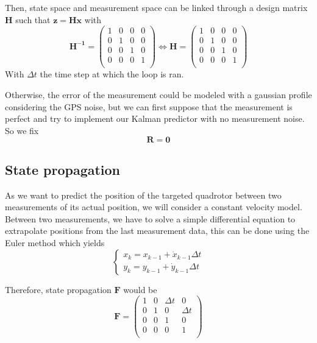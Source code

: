 \documentclass[12pt]{article}
\begin{document}
Then, state space and measurement space can be linked through a design matrix $\mathbf{H}$ such that $\mathbf{z} = \mathbf{H}\mathbf{x}$ with
\begin{equation}
\mathbf{H^{-1}} =
    \begin{pmatrix}
        1 & 0 & 0 & 0 \\
        0 & 1 & 0 & 0 \\
        0 & 0 & 1 & 0 \\
        0 & 0 & 0 & 1 \\
    \end{pmatrix}
\iff
\mathbf{H} =
    \begin{pmatrix}
        1 & 0 & 0 & 0 \\
        0 & 1 & 0 & 0 \\
        0 & 0 & 1 & 0 \\
        0 & 0 & 0 & 1 \\
    \end{pmatrix}
\end{equation}
With $\Delta{t}$ the time step at which the loop is ran.

Otherwise, the error of the measurement could be modeled with a gaussian profile considering the GPS noise, but we can first suppose that the measurement is perfect and try to implement our Kalman predictor with no measurement noise.
So we fix
\begin{equation}
\mathbf{R} = \mathbf{0}
\end{equation}

\subsection{State propagation}
As we want to predict the position of the targeted quadrotor between two measurements of its actual position, we will consider a constant velocity model.
Between two measurements, we have to solve a simple differential equation to extrapolate positions from the last measurement data, this can be done using the Euler method which yields
\begin{equation}
\left\{
    \begin{array}{l}
    x_k = x_{k-1} + \dot{x}_{k-1}\Delta{t} \\
    y_k = y_{k-1} + \dot{y}_{k-1}\Delta{t}
    \end{array}
\right.
\end{equation}

Therefore, state propagation $\mathbf{F}$ would be
\begin{equation}
\mathbf{F} =
    \begin{pmatrix}
        1 & 0 & \Delta{t} & 0 \\
        0 & 1 & 0 & \Delta{t} \\
        0 & 0 & 1 & 0 \\
        0 & 0 & 0 & 1 \\
    \end{pmatrix}
\end{equation}
\end{document}
